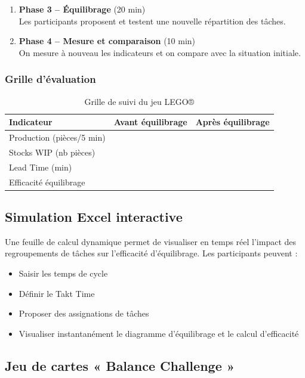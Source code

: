\documentclass[12pt,a4paper]{article}
\begin{document}
\begin{center}
\begin{enumerate}
    \item \textbf{Phase 3 – Équilibrage} (20 min) \\
    Les participants proposent et testent une nouvelle répartition des tâches.
    
    \item \textbf{Phase 4 – Mesure et comparaison} (10 min) \\
    On mesure à nouveau les indicateurs et on compare avec la situation initiale.
\end{enumerate}

\subsubsection{Grille d’évaluation}

\begin{table}[H]
\centering
\begin{tabular}{|l|c|c|}
\hline
\textbf{Indicateur} & \textbf{Avant équilibrage} & \textbf{Après équilibrage} \\ \hline
Production (pièces/5 min) & & \\
Stocks WIP (nb pièces) & & \\
Lead Time (min) & & \\
Efficacité équilibrage & & \\ \hline
\end{tabular}
\caption{Grille de suivi du jeu LEGO®}
\label{tab:jeu_lego}
\end{table}

\subsection{Simulation Excel interactive}
Une feuille de calcul dynamique permet de visualiser en temps réel l’impact des regroupements de tâches sur l’efficacité d’équilibrage. Les participants peuvent :
\begin{itemize}
    \item Saisir les temps de cycle
    \item Définir le Takt Time
    \item Proposer des assignations de tâches
    \item Visualiser instantanément le diagramme d’équilibrage et le calcul d’efficacité
\end{itemize}

\subsection{Jeu de cartes « Balance Challenge »}

\end{center}
\end{document}
